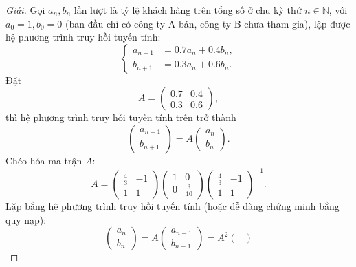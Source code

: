 \documentclass{article}
\begin{document}
\begin{proof}[Giải]
	Gọi $a_n,b_n$ lần lượt là tỷ lệ khách hàng trên tổng số ở chu kỳ thứ $n\in\mathbb{N}$, với $a_0 = 1,b_0 = 0$ (ban đầu chỉ có công ty A bán, công ty B chưa tham gia), lập được hệ phương trình truy hồi tuyến tính:
	\begin{equation*}
		\left\{\begin{split}
			a_{n+1} &= 0.7a_n + 0.4b_n,\\
			b_{n+1} &= 0.3a_n + 0.6b_n.
		\end{split}\right.
	\end{equation*}
	Đặt
	\begin{equation*}
		A = \begin{pmatrix}
			0.7 & 0.4\\0.3 & 0.6
		\end{pmatrix},
	\end{equation*}
	thì hệ phương trình truy hồi tuyến tính trên trở thành
	\begin{equation*}
		\begin{pmatrix}
			a_{n+1}\\b_{n+1}
		\end{pmatrix} = A\begin{pmatrix}
			a_n\\b_n
		\end{pmatrix}.
	\end{equation*}
	Chéo hóa ma trận $A$:
	\begin{equation*}
		A = \begin{pmatrix}
			\frac{4}{3} & -1\\1 & 1
		\end{pmatrix}\begin{pmatrix}
			1 & 0\\0 & \frac{3}{10}
		\end{pmatrix}\begin{pmatrix}
			\frac{4}{3} & -1\\1 & 1
		\end{pmatrix}^{-1}.
	\end{equation*}
	Lặp bằng hệ phương trình truy hồi tuyến tính (hoặc dễ dàng chứng minh bằng quy nạp):
	\begin{equation*}
		\begin{pmatrix}
			a_n\\b_n
		\end{pmatrix} = A\begin{pmatrix}
			a_{n-1}\\b_{n-1}
		\end{pmatrix} = A^2\begin{pmatrix}

\end{pmatrix}
\end{equation*}
\end{proof}
\end{document}
